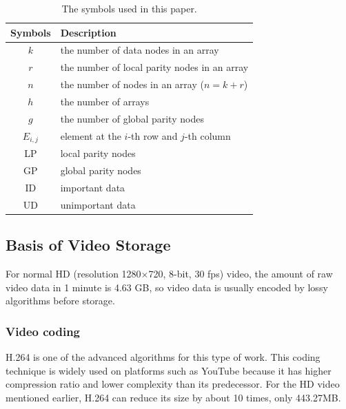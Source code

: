 \documentclass[sigconf]{acmart}
\begin{document}
\begin{table}[]
\caption{The symbols used in this paper.}\label{parameter}
\centering
\begin{tabular}{|c|l|}
\hline
Symbols & Description \\ \hline
$k$ & the number of data nodes in an array \\ \hline
$r$ & the number of local parity nodes in an array \\ \hline
$n$ & the number of nodes in an array ($n=k+r$) \\ \hline
$h$ & the number of arrays \\ \hline
$g$ & the number of global parity nodes \\ \hline
$E_{i,j}$ & element at the $i$-th row and $j$-th column \\ \hline 
LP & local parity nodes \\ \hline
GP & global parity nodes \\ \hline
ID & important data \\ \hline
UD & unimportant data \\ \hline
\end{tabular}
\end{table}


\subsection{Basis of Video Storage}\label{video storage}
For normal HD (resolution 1280$\times$720, 8-bit, 30 fps) video, the amount of raw video data in 1 minute is 4.63 GB, so video data is usually encoded by lossy algorithms before storage. 

\subsubsection{Video coding}
H.264 is one of the advanced algorithms for this type of work. This coding technique is widely used on platforms such as YouTube because it has higher compression ratio and lower complexity than its predecessor. For the HD video mentioned earlier, H.264 can reduce its size by about 10 times, only 443.27MB.
\end{document}
